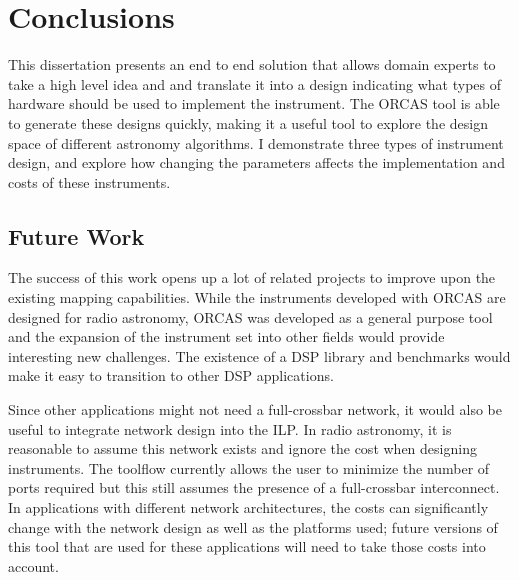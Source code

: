 \chapter{Conclusions}
\label{chap:Conclusions}


This dissertation presents an end to end solution that allows domain experts to take a high level idea and and translate it into a design indicating what types of hardware should be used to implement the instrument. 
The ORCAS tool is able to generate these designs quickly, making it a useful tool to explore the design space of different astronomy algorithms.
I demonstrate three types of instrument design, and explore how changing the parameters affects the implementation and costs of these instruments.



\section{Future Work}
The success of this work opens up a lot of related projects to improve upon the existing mapping capabilities.
While the instruments developed with ORCAS are designed for radio astronomy, ORCAS was developed as a general purpose tool and the expansion of the instrument set into other fields would provide interesting new challenges.
The existence of a DSP library and benchmarks would make it easy to transition to other DSP applications.

Since other applications might not need a full-crossbar network, it would also be useful to integrate network design into the ILP.
In radio astronomy, it is reasonable to assume this network exists and ignore the cost when designing instruments.
The toolflow currently allows the user to minimize the number of ports required but this still assumes the presence of a full-crossbar interconnect.
In applications with different network architectures, the costs can significantly change with the network design as well as the platforms used; future versions of this tool that are used for these applications will need to take those costs into account.


